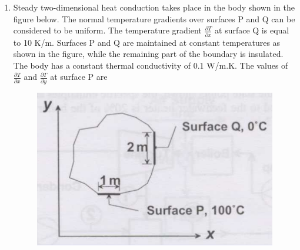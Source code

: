 \documentclass[journal,12pt,onecolumn]{IEEEtran}
\begin{document}
\begin{enumerate}[resume]
    \item Steady two-dimensional heat conduction takes place in the body shown in the figure below. The normal temperature gradients over surfaces P and Q can be considered to be uniform. The temperature gradient $\frac{\partial{T}}{\partial{x}}$ at surface Q is equal to 10 K/m. Surfaces P and Q are maintained at constant temperatures as shown in the figure, while the remaining part of the boundary is insulated. The body has a constant thermal conductivity of 0.1 W/m.K. The values of $\frac{\partial{T}}{\partial{x}}$ and $\frac{\partial{T}}{\partial{y}}$ at surface P are

          \begin{figure}[H]
              \centering
              \includegraphics[scale=0.3]{q56}
              \caption{}
              \label{q56}
          \end{figure}

          \begin{enumerate}
          \end{enumerate}


\end{enumerate}
\end{document}
